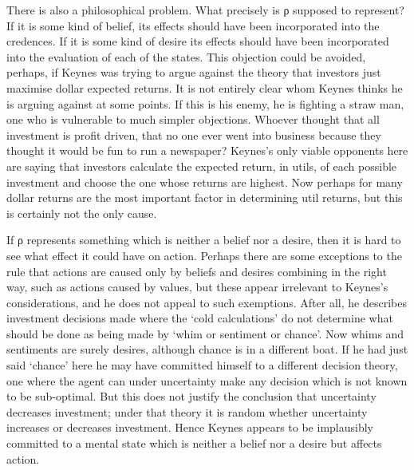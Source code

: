 \documentclass[
  11pt,
  letterpaper,
  DIV=11,
  numbers=noendperiod,
  twoside]{scrartcl}
\begin{document}
There is also a philosophical problem. What precisely is ρ supposed to
represent? If it is some kind of belief, its effects should have been
incorporated into the credences. If it is some kind of desire its
effects should have been incorporated into the evaluation of each of the
states. This objection could be avoided, perhaps, if Keynes was trying
to argue against the theory that investors just maximise dollar expected
returns. It is not entirely clear whom Keynes thinks he is arguing
against at some points. If this is his enemy, he is fighting a straw
man, one who is vulnerable to much simpler objections. Whoever thought
that all investment is profit driven, that no one ever went into
business because they thought it would be fun to run a newspaper?
Keynes's only viable opponents here are saying that investors calculate
the expected return, in utils, of each possible investment and choose
the one whose returns are highest. Now perhaps for many dollar returns
are the most important factor in determining util returns, but this is
certainly not the only cause.

If ρ represents something which is neither a belief nor a desire, then
it is hard to see what effect it could have on action. Perhaps there are
some exceptions to the rule that actions are caused only by beliefs and
desires combining in the right way, such as actions caused by values,
but these appear irrelevant to Keynes's considerations, and he does not
appeal to such exemptions. After all, he describes investment decisions
made where the `cold calculations' do not determine what should be done
as being made by `whim or sentiment or chance'. Now whims and sentiments
are surely desires, although chance is in a different boat. If he had
just said `chance' here he may have committed himself to a different
decision theory, one where the agent can under uncertainty make any
decision which is not known to be sub-optimal. But this does not justify
the conclusion that uncertainty decreases investment; under that theory
it is random whether uncertainty increases or decreases investment.
Hence Keynes appears to be implausibly committed to a mental state which
is neither a belief nor a desire but affects action.
\end{document}
